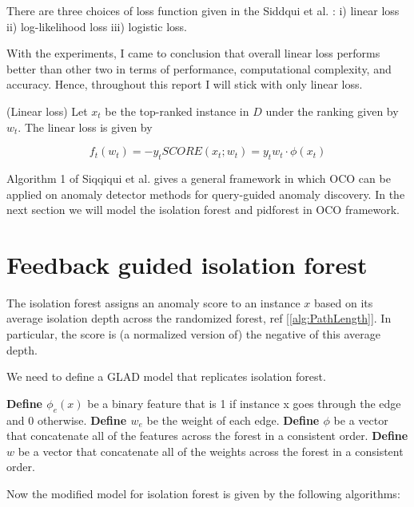 There are three choices of loss function given in the Siddqui et al. \cite{10.1145/3219819.3220083}: i) linear loss ii) log-likelihood loss iii) logistic loss. 

With the experiments, I came to conclusion that overall linear loss performs better than other two in terms of performance, computational complexity, and accuracy. Hence, throughout this report I will stick with only linear loss.

\begin{defn}
    \label{defn:linear-loss}
    (Linear loss)
    Let $x_t$ be the top-ranked instance in $D$ under the ranking given by $w_t$. The linear loss is given by 

    \vspace{-2em}
    \begin{equation}
        \label{eq:linear-loss}
        f_t(w_t) = -y_t SCORE(x_t;w_t) = y_t w_t \cdot \phi (x_t)
    \end{equation}
\end{defn}

Algorithm 1 of Siqqiqui et al. \cite{10.1145/3219819.3220083} gives a general framework in which OCO can be applied on anomaly detector methods for query-guided anomaly discovery. In the next section we will model the isolation forest and pidforest in OCO framework.


\section{Feedback guided isolation forest}
\label{sec:feedback-guided-iforest}

The isolation forest assigns an anomaly score to an instance $x$ based on its average isolation depth across the randomized forest, ref [\ref{alg:PathLength}]. 
In particular, the score is (a normalized version of) the negative of
this average depth.

We need to define a GLAD model that replicates isolation forest.

\textbf{Define $\phi_e(x)$} be a binary feature that is 1 if instance x goes through the edge and 0 otherwise.
\textbf{Define $w_e$} be the weight of each edge.
\textbf{Define $\phi$}  be a vector that concatenate all of the features across the forest in a consistent order.
\textbf{Define $w$}  be a vector that concatenate all of the weights across the forest in a consistent order.

Now the modified model for isolation forest is given by the following algorithms:



